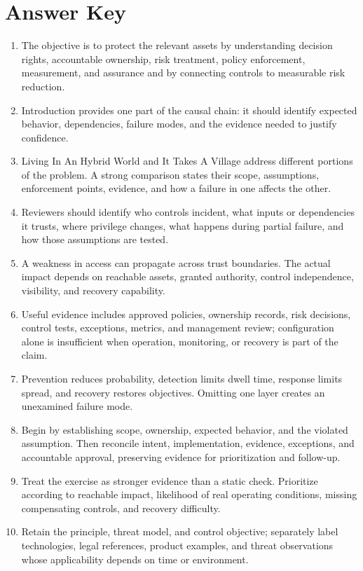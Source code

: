 \documentclass[11pt,letterpaper]{article}
\begin{document}
\section*{Answer Key}
\begin{enumerate}
\item The objective is to protect the relevant assets by understanding decision rights, accountable ownership, risk treatment, policy enforcement, measurement, and assurance and by connecting controls to measurable risk reduction.
\item Introduction provides one part of the causal chain: it should identify expected behavior, dependencies, failure modes, and the evidence needed to justify confidence.
\item Living In An Hybrid World and It Takes A Village address different portions of the problem. A strong comparison states their scope, assumptions, enforcement points, evidence, and how a failure in one affects the other.
\item Reviewers should identify who controls incident, what inputs or dependencies it trusts, where privilege changes, what happens during partial failure, and how those assumptions are tested.
\item A weakness in access can propagate across trust boundaries. The actual impact depends on reachable assets, granted authority, control independence, visibility, and recovery capability.
\item Useful evidence includes approved policies, ownership records, risk decisions, control tests, exceptions, metrics, and management review; configuration alone is insufficient when operation, monitoring, or recovery is part of the claim.
\item Prevention reduces probability, detection limits dwell time, response limits spread, and recovery restores objectives. Omitting one layer creates an unexamined failure mode.
\item Begin by establishing scope, ownership, expected behavior, and the violated assumption. Then reconcile intent, implementation, evidence, exceptions, and accountable approval, preserving evidence for prioritization and follow-up.
\item Treat the exercise as stronger evidence than a static check. Prioritize according to reachable impact, likelihood of real operating conditions, missing compensating controls, and recovery difficulty.
\item Retain the principle, threat model, and control objective; separately label technologies, legal references, product examples, and threat observations whose applicability depends on time or environment.
\end{enumerate}
\end{document}
